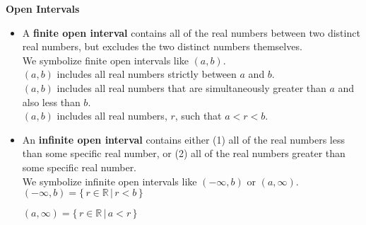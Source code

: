 \documentclass{ximera}
\begin{document}
\begin{definition}  \textbf{\textcolor{green!50!black}{Open Intervals}} 



\begin{itemize}
\item A \textbf{finite open interval} contains all of the real numbers between two distinct real numbers, but excludes the two distinct numbers themselves.\\

We symbolize finite open intervals like $(a, b)$. \\

$(a,b)$ includes all real numbers strictly between $a$ and $b$. \\ 
$(a,b)$ includes all real numbers that are simultaneously greater than $a$ and also less than $b$.  \\
$(a,b)$ includes all real numbers, $r$, such that $a < r < b$.



\item An \textbf{infinite open interval} contains either (1) all of the real numbers less than some specific real number, or (2) all of the real numbers greater than some specific real number. \\

We symbolize infinite open intervals like $(-\infty, b)$ or $(a, \infty)$. \\

$(-\infty, b) = \{ \, r \in \mathbb{R} \, | \,  r < b   \,  \}$

$(a, \infty) = \{ \, r \in \mathbb{R} \, | \,  a < r   \,  \}$

\end{itemize}

\end{definition}
\end{document}
